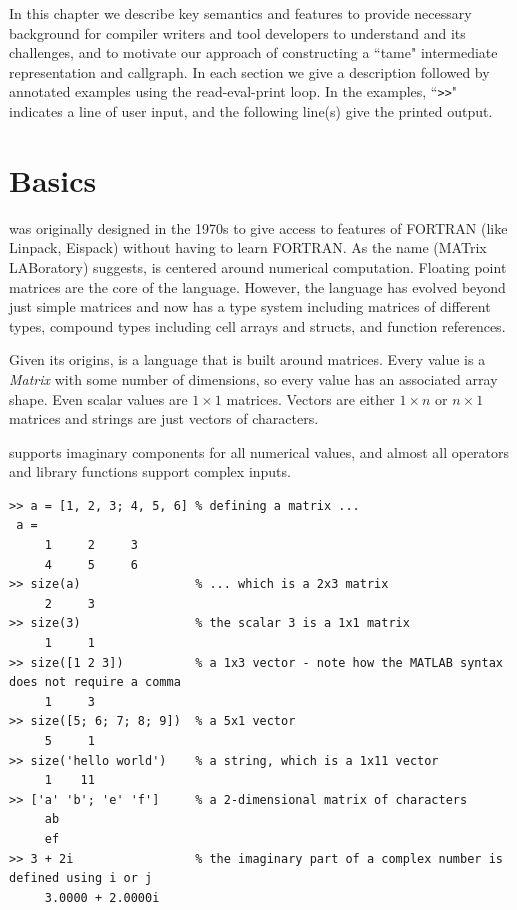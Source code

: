 

In this chapter we describe key \matlab semantics and features to provide
necessary background for compiler writers and tool developers to understand
\matlab and its challenges, and to motivate our approach of constructing a
``tame" intermediate representation and \matlab callgraph.  In each section
we give a description followed by annotated examples using the \matlab
read-eval-print loop.   In the examples, ``\lstinline{>>}" indicates a line of
user input,  and the following line(s) give the printed output.

\section{Basics}

\matlab was originally designed in the 1970s to give access to features of {\sc
FORTRAN} (like {\sc Linpack}, {\sc Eispack}) without having to learn {\sc
FORTRAN}\cite{MatlabOrigins}. As the name \smatlab \hspace{1pt} (MATrix LABoratory)
suggests, \matlab is centered around numerical computation. Floating point
matrices are the core of the language.  However, the language has evolved
beyond just simple matrices and now has a type system including matrices of
different types, compound types including cell arrays and structs, and function
references. 

Given its origins, \matlab is a language that is built around matrices. Every
value is a \textit{Matrix} with some number of dimensions, so every value has
an associated array shape. Even scalar values are $1 \times 1$ matrices.
Vectors are either $1 \times n$ or $n \times 1$ matrices and strings are just
vectors of characters.  

\matlab supports imaginary components for all numerical values, and almost all 
operators and library functions support complex inputs.

\begin{lstlisting}
>> a = [1, 2, 3; 4, 5, 6] % defining a matrix ...
 a =
     1     2     3
     4     5     6
>> size(a)                % ... which is a 2x3 matrix
     2     3
>> size(3)                % the scalar 3 is a 1x1 matrix
     1     1
>> size([1 2 3])          % a 1x3 vector - note how the MATLAB syntax does not require a comma
     1     3
>> size([5; 6; 7; 8; 9])  % a 5x1 vector
     5     1
>> size('hello world')    % a string, which is a 1x11 vector
     1    11
>> ['a' 'b'; 'e' 'f']     % a 2-dimensional matrix of characters
     ab
     ef
>> 3 + 2i                 % the imaginary part of a complex number is defined using i or j
     3.0000 + 2.0000i
\end{lstlisting}



